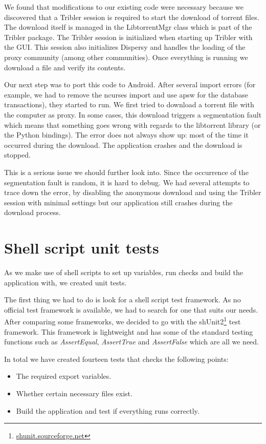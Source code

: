 	We found that modifications to our existing code were necessary because we discovered that a Tribler session is required to start the download of torrent files. The download itself is managed in the LibtorrentMgr class which is part of the Tribler package. The Tribler session is initialized when starting up Tribler with the GUI. This session also initializes Dispersy and handles the loading of the proxy community (among other communities). Once everything is running we download a file and verify its contents.
	
	Our next step was to port this code to Android. After several import errors (for example, we had to remove the ncurses import and use apsw for the database transactions), they started to run. We first tried to download a torrent file with the computer as proxy. In some cases, this download triggers a segmentation fault which means that something goes wrong with regards to the libtorrent library (or the Python bindings). The error does not always show up: most of the time it occurred during the download. The application crashes and the download is stopped.
	
	This is a serious issue we should further look into. Since the occurrence of the segmentation fault is random, it is hard to debug. We had several attempts to trace down the error, by disabling the anonymous download and using the Tribler session with minimal settings but our application still crashes during the download process.

	\section{Shell script unit tests}
		As we make use of shell scripts to set up variables, run checks and build the application with, we created unit tests.
		
		The first thing we had to do is look for a shell script test framework. As no official test framework is available, we had to search for one that suits our needs. After comparing some frameworks, we decided to go with the shUnit2\footnote{\href{http://shunit.sourceforge.net}{shunit.sourceforge.net}} test framework. This framework is lightweight and has some of the standard testing functions such as \emph{AssertEqual}, \emph{AssertTrue} and \emph{AssertFalse} which are all we need. 
		
		In total we have created fourteen tests that checks the following points:
		
		\begin{itemize}
			\item The required export variables.
			\item Whether certain necessary files exist.
			\item Build the application and test if everything runs correctly.
		\end{itemize}
		
